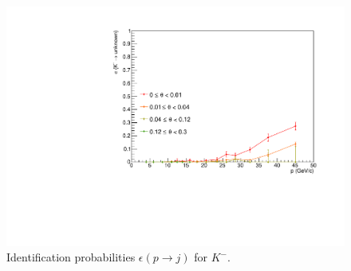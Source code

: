 \begin{figure}[!p]
  \includegraphics[scale=0.38]{./gfx/Km_u.pdf}
	\caption{Identification probabilities $\epsilon(p \rightarrow j)$ for $K^-$.}
	\label{pic:Effpim}
\end{figure}

